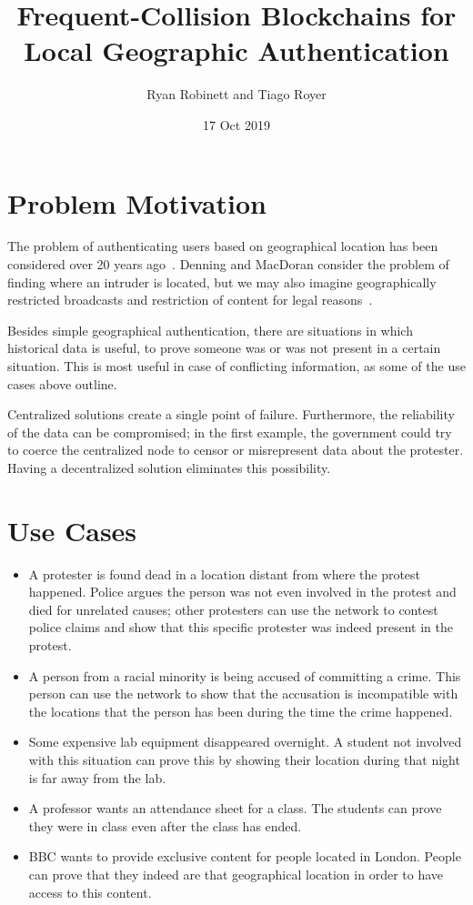 \documentclass{article}
\title{Frequent-Collision Blockchains for Local Geographic Authentication}
\author{Ryan Robinett and Tiago Royer}
\date{17 Oct 2019}
\begin{document}
\maketitle

\section*{Problem Motivation}

The problem of authenticating users based on geographical location
has been considered over 20 years ago~\cite{denning_1996}.
Denning and MacDoran consider the problem of finding where an intruder is located,
but we may also imagine geographically restricted broadcasts
and restriction of content for legal reasons~\cite{gdpr}.

Besides simple geographical authentication,
there are situations in which historical data is useful,
to prove someone was or was not present in a certain situation.
This is most useful in case of conflicting information,
as some of the use cases above outline.

Centralized solutions create a single point of failure.
Furthermore,
the reliability of the data can be compromised;
in the first example,
the government could try to coerce the centralized node
to censor or misrepresent data about the protester.
Having a decentralized solution eliminates this possibility.


\section*{Use Cases}

\begin{itemize}
	\item A protester is found dead in a location distant from where the protest happened.
		Police argues the person was not even involved in the protest
		and died for unrelated causes;
		other protesters can use the network to contest police claims
		and show that this specific protester was indeed present in the protest.

	\item A person from a racial minority is being accused of committing a crime.
		This person can use the network to show that the accusation
		is incompatible with the locations that the person has been
		during the time the crime happened.

	\item Some expensive lab equipment disappeared overnight.
		A student not involved with this situation
		can prove this by showing their location during that night
		is far away from the lab.

	\item A professor wants an attendance sheet for a class.
		The students can prove they were in class
		even after the class has ended.

	\item BBC wants to provide exclusive content for people located in London.
		People can prove that they indeed are that geographical location
		in order to have access to this content.
\end{itemize}
\end{document}
